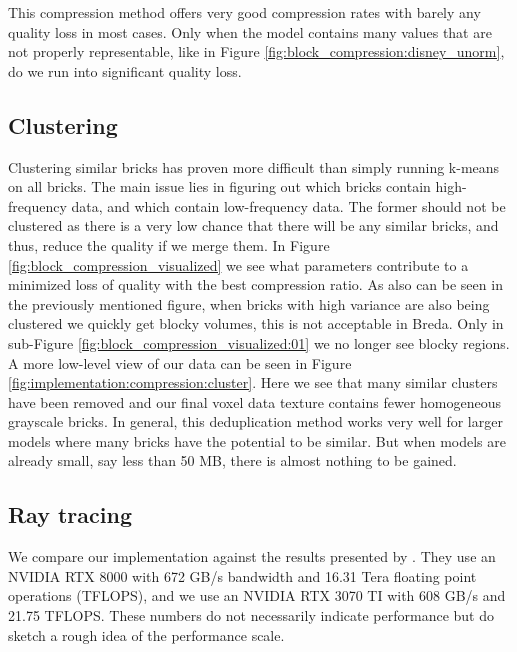 This compression method offers very good compression rates with barely any quality loss in most cases. Only when the model contains many values that are not properly representable, like in Figure \ref{fig:block_compression:disney_unorm}, do we run into significant quality loss.

\subsection{Clustering} \label{results:clustering}
Clustering similar bricks has proven more difficult than simply running k-means on all bricks. The main issue lies in figuring out which bricks contain high-frequency data, and which contain low-frequency data. The former should not be clustered as there is a very low chance that there will be any similar bricks, and thus, reduce the quality if we merge them. In Figure \ref{fig:block_compression_visualized} we see what parameters contribute to a minimized loss of quality with the best compression ratio. As also can be seen in the previously mentioned figure, when bricks with high variance are also being clustered we quickly get blocky volumes, this is not acceptable in Breda. Only in sub-Figure \ref{fig:block_compression_visualized:01} we no longer see blocky regions. A more low-level view of our data can be seen in Figure \ref{fig:implementation:compression:cluster}. Here we see that many similar clusters have been removed and our final voxel data texture contains fewer homogeneous grayscale bricks.  In general, this deduplication method works very well for larger models where many bricks have the potential to be similar. But when models are already small, say less than 50 MB, there is almost nothing to be gained.

\subsection{Ray tracing} \label{results:ray_tracing}
We compare our implementation against the results presented by \cite{NanoVDBBenchmark}. They use an NVIDIA RTX 8000 with 672 GB/s bandwidth and 16.31 Tera floating point operations (TFLOPS), and we use an NVIDIA RTX 3070 TI with 608 GB/s and 21.75 TFLOPS. These numbers do not necessarily indicate performance but do sketch a rough idea of the performance scale.

